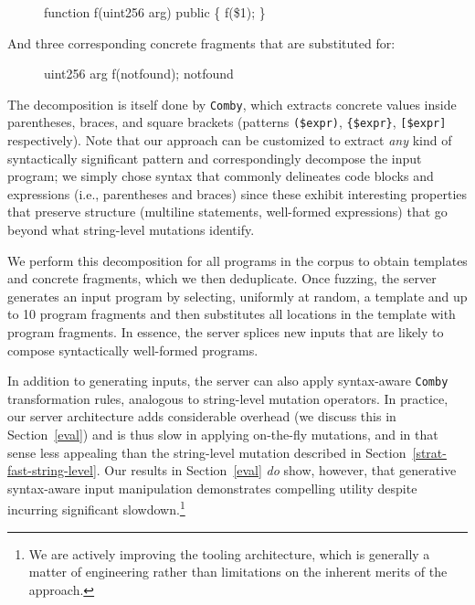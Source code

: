 \begin{figure}[ht!]
\begin{code}
function f(uint256 arg) public \{
    f(\$1);
\} 
\end{code}
\end{figure}

And three corresponding concrete fragments that are substituted for:

\begin{figure}[ht!]
\begin{code}
uint256 arg
f(notfound);
notfound
\end{code}
\end{figure}

The decomposition is itself done by \texttt{Comby}, which extracts concrete
values inside parentheses, braces, and square brackets (patterns
\texttt{(\$expr)}, \texttt{\{\$expr\}}, \texttt{[\$expr]} respectively). Note
that our approach can be customized to extract \emph{any} kind of syntactically
significant pattern and correspondingly decompose the input program; we simply
chose syntax that commonly delineates code blocks and expressions (i.e.,
parentheses and braces) since these exhibit interesting properties that
preserve structure (multiline statements, well-formed expressions) that go
beyond what string-level mutations identify.

We perform this decomposition for all programs in the corpus to obtain
templates and concrete fragments, which we then deduplicate. Once fuzzing, the
server generates an input program by selecting, uniformly at random, a template
and up to 10 program fragments and then substitutes all locations in the
template with program fragments. In essence, the server splices new inputs that
are likely to compose syntactically well-formed programs.

In addition to generating inputs, the server can also apply syntax-aware
\texttt{Comby} transformation rules, analogous to string-level mutation
operators. In practice, our server architecture adds considerable overhead (we
discuss this in Section~\ref{eval}) and is thus slow in applying
on-the-fly mutations, and in that sense less
appealing than the string-level mutation described in Section~\ref{strat-fast-string-level}. Our
results in Section~\ref{eval} \emph{do} show, however, that generative
syntax-aware input manipulation demonstrates compelling utility despite
incurring significant slowdown.\footnote{We are actively improving the tooling
architecture, which is generally a matter of engineering rather than
limitations on the inherent merits of the approach.}

